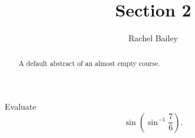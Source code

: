\documentclass{ximera}
\title{Section 2}
\author{Rachel Bailey}
\begin{document}
\begin{abstract}
    A default abstract of an almost empty course.
\end{abstract}
\maketitle



\begin{exercise}

Evaluate
\[
\sin\left(\sin^{-1}\frac{7}{6}\right).
\]

\begin{multipleChoice}
\end{multipleChoice}

\end{exercise}
\end{document}
